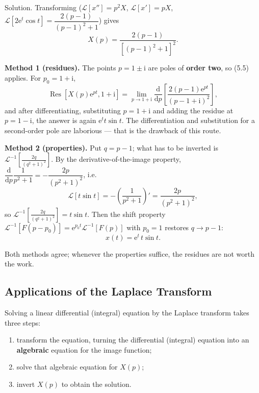 \documentclass[11pt,a4paper]{article}
\theoremstyle{definition}
\theoremstyle{plain}
\begin{document}
Solution. Transforming ($\mathcal{L}[x'']=p^2X$, $\mathcal{L}[x']=pX$,
$\mathcal{L}\left[2\mathrm{e}^{t}\cos t\right]=\dfrac{2(p-1)}{(p-1)^2+1}$) gives
\begin{equation*}
X(p)=\frac{2(p-1)}{\left[(p-1)^2+1\right]^2} .
\end{equation*}

\textbf{Method 1 (residues).} The points $p=1\pm\mathrm{i}$ are poles of \textbf{order two}, so
(5.5) applies. For $p_0=1+\mathrm{i}$,
\begin{equation*}
\operatorname{Res}\left[X(p)\mathrm{e}^{pt},1+\mathrm{i}\right]
=\lim_{p\to 1+\mathrm{i}}\frac{\mathrm{d}}{\mathrm{d}p}\left[
\frac{2(p-1)\mathrm{e}^{pt}}{\left(p-1+\mathrm{i}\right)^2}\right],
\end{equation*}
and after differentiating, substituting $p=1+\mathrm{i}$ and adding the residue at
$p=1-\mathrm{i}$, the answer is again $\mathrm{e}^{t}t\sin t$. The differentiation and substitution
for a second-order pole are laborious --- that is the drawback of this route.

\textbf{Method 2 (properties).} Put $q=p-1$; what has to be inverted is
$\mathcal{L}^{-1}\left[\frac{2q}{\left(q^2+1\right)^2}\right]$. By the derivative-of-the-image
property, $\dfrac{\mathrm{d}}{\mathrm{d}p}\dfrac{1}{p^2+1}
=-\dfrac{2p}{\left(p^2+1\right)^2}$, i.e.
\begin{equation*}
\mathcal{L}\left[t\sin t\right]=-\left(\frac{1}{p^2+1}\right)'
=\frac{2p}{\left(p^2+1\right)^2},
\end{equation*}
so $\mathcal{L}^{-1}\left[\frac{2q}{\left(q^2+1\right)^2}\right]=t\sin t$. Then the shift property
$\mathcal{L}^{-1}\left[F(p-p_0)\right]=\mathrm{e}^{p_0 t}\mathcal{L}^{-1}\left[F(p)\right]$ with
$p_0=1$ restores $q\to p-1$:
\begin{equation*}
x(t)=\mathrm{e}^{t}\,t\sin t .
\end{equation*}

Both methods agree; whenever the properties suffice, the residues are not worth the work.

\clearpage
\subsection{Applications of the Laplace Transform}

Solving a linear differential (integral) equation by the Laplace transform takes three steps:
\begin{enumerate}[itemsep=2pt,topsep=3pt]
    \item transform the equation, turning the differential (integral) equation into an
          \textbf{algebraic} equation for the image function;
    \item solve that algebraic equation for $X(p)$;
    \item invert $X(p)$ to obtain the solution.
\end{enumerate}
\end{document}
